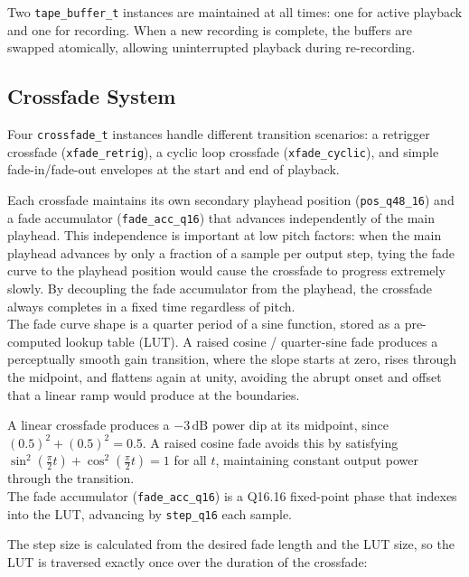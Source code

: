Two \texttt{tape\_buffer\_t} instances are maintained at all times: one for active playback and one for recording. 
When a new recording is complete, the buffers are swapped atomically, allowing uninterrupted playback during re-recording.


\newpage
\subsection{Crossfade System}

Four \texttt{crossfade\_t} instances handle different transition scenarios: a retrigger crossfade (\texttt{xfade\_retrig}), a cyclic loop crossfade (\texttt{xfade\_cyclic}), and simple fade-in/fade-out envelopes at the start and end of playback. 

Each crossfade maintains its own secondary playhead position (\texttt{pos\_q48\_16}) and a fade accumulator (\texttt{fade\_acc\_q16}) that advances independently of the main playhead. 
This independence is important at low pitch factors: when the main playhead advances by only a fraction of a sample per output step, tying the fade curve to the playhead position would cause the crossfade to progress extremely slowly. 
By decoupling the fade accumulator from the playhead, the crossfade always completes in a fixed time regardless of pitch. \\

The fade curve shape is a quarter period of a sine function, stored as a pre-computed lookup table (\ac{LUT}). 
A raised cosine / quarter-sine fade produces a perceptually smooth gain transition, where the slope starts at zero, rises through the midpoint, and flattens again at unity, avoiding the abrupt onset and offset that a linear ramp would produce at the boundaries. 

A linear crossfade produces a $-3\,\text{dB}$ power dip at its midpoint,
since $(0.5)^2 + (0.5)^2 = 0.5$.
A raised cosine fade avoids this by satisfying
$\sin^2\!\left(\tfrac{\pi}{2}t\right) + \cos^2\!\left(\tfrac{\pi}{2}t\right) = 1$
for all $t$, maintaining constant output power through the transition. \\

The fade accumulator (\texttt{fade\_acc\_q16}) is a Q16.16 fixed-point phase that indexes into the LUT, advancing by \texttt{step\_q16} each sample. 


The step size is calculated from the desired fade length and the LUT size, so the LUT is traversed exactly once over the duration of the crossfade:

